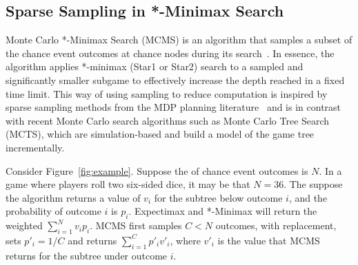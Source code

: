 \documentclass{article}
\begin{document}
\subsection{Sparse Sampling in *-Minimax Search}

Monte Carlo *-Minimax Search (MCMS) is an algorithm that samples a subset of the chance event outcomes at chance nodes
during its search~\cite{Lanctot13MCMS}. In essence, the algorithm applies *-minimax (Star1 or Star2) search to a sampled 
and significantly smaller subgame to effectively increase the depth reached in a fixed time limit. 
This way of using sampling to reduce computation is inspired by sparse sampling methods from the 
MDP planning literature~\cite{kearns99} and is in contrast with recent Monte Carlo search algorithms such as Monte 
Carlo Tree Search (MCTS), which are simulation-based and build a model of the game tree incrementally.

Consider Figure~\ref{fig:example}. Suppose the of chance event outcomes is $N$. 
In a game where players roll two six-sided dice, it may be that $N = 36$.  
The suppose the algorithm returns a value of $v_i$ for the subtree below outcome $i$, and the probability of outcome
$i$ is $p_i$. Expectimax and *-Minimax will return the weighted $\sum_{i = 1}^N v_i p_i$. MCMS first samples $C < N$ outcomes,
with replacement, sets $p'_i = 1/C$ and returns $\sum_{i = 1}^C p'_i v'_i$, where $v'_i$ is the value that MCMS 
returns for the subtree under outcome $i$. 
\end{document}

